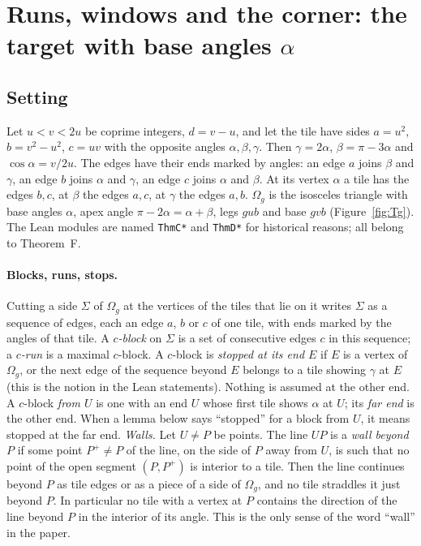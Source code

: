 \documentclass[11pt,reqno]{amsart}
\theoremstyle{plain}
\theoremstyle{definition}
\begin{document}
\section{Runs, windows and the corner: the target with base angles $\alpha$}\label{sec:runs}

\subsection{Setting}\label{sub:runsetting}
Let $u<v<2u$ be coprime integers, $d=v-u$, and let the tile have sides $a=u^2$, $b=v^2-u^2$, $c=uv$ with the opposite angles $\alpha,\beta,\gamma$. Then $\gamma=2\alpha$, $\beta=\pi-3\alpha$ and $\cos\alpha=v/2u$. The edges
have their ends marked by angles: an edge $a$ joins $\beta$ and $\gamma$, an edge $b$ joins $\alpha$ and $\gamma$, an edge $c$
joins $\alpha$ and $\beta$. At its vertex $\alpha$ a tile has the edges $b,c$, at $\beta$ the edges $a,c$, at $\gamma$ the edges $a,b$.
$\Omega_{g}$ is the isosceles triangle with base angles $\alpha$, apex angle $\pi-2\alpha=\alpha+\beta$, legs $gub$ and base $gvb$ (Figure~\ref{fig:Tg}). The Lean modules are named \texttt{ThmC*} and \texttt{ThmD*} for historical reasons; all belong to Theorem~F.

\paragraph{Blocks, runs, stops.} Cutting a side $\Sigma$ of $\Omega_{g}$ at the vertices of the tiles that lie on it writes $\Sigma$ as a sequence of edges, each an edge $a$, $b$ or $c$ of one tile, with ends marked by the angles of that tile.
A \emph{$c$-block} on $\Sigma$ is a set of consecutive edges $c$ in this sequence; a \emph{$c$-run} is a maximal $c$-block. A $c$-block is \emph{stopped at its end $E$} if $E$ is a vertex of $\Omega_{g}$, or the next edge of the sequence beyond $E$ belongs to a tile showing $\gamma$ at $E$ (this is the notion in the Lean statements). Nothing is assumed at the other end. A $c$-block \emph{from $U$} is one with an end $U$ whose first tile shows $\alpha$ at $U$; its \emph{far end} is the other end. When a lemma below says ``stopped'' for a block from $U$, it means stopped at the far end.
\emph{Walls.} Let $U\ne P$ be points. The line $UP$ is a \emph{wall beyond $P$} if some point $P^+\ne P$ of the line, on the side of $P$ away from $U$, is such that no point of the open segment $(P,P^+)$ is interior to a tile. Then the line continues beyond $P$ as tile edges or as a piece of a side of $\Omega_{g}$, and no tile straddles it just beyond $P$. In particular no tile with a vertex at $P$ contains the direction of the line beyond $P$ in the interior of its angle. This is the only sense of the word ``wall'' in the paper.
\end{document}

